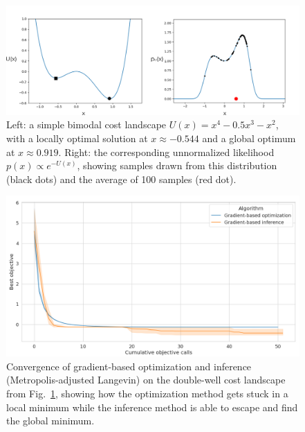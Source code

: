 \begin{figure}[tb]
    \centering
    \includegraphics[width=0.6\linewidth]{images/ch6/sampling_as_optimization.png}
    \caption{Left: a simple bimodal cost landscape $U(x) = x^4 - 0.5 x^3 - x^2$, with a locally optimal solution at $x\approx -0.544$ and a global optimum at $x\approx 0.919$. Right: the corresponding unnormalized likelihood $p(x) \propto e^{-U(x)}$, showing samples drawn from this distribution (black dots) and the average of 100 samples (red dot).}
    \label{ch6:fig:toy_example}
\end{figure}

\begin{figure}[tb]
    \centering
    \includegraphics[width=0.6\linewidth]{images/ch6/double_well_gd_mala.png}
    \caption{Convergence of gradient-based optimization and inference (Metropolis-adjusted Langevin) on the double-well cost landscape from Fig.~\ref{ch6:fig:toy_example}, showing how the optimization method gets stuck in a local minimum while the inference method is able to escape and find the global minimum.}
    \label{ch6:fig:toy_example_convergence}
\end{figure}

